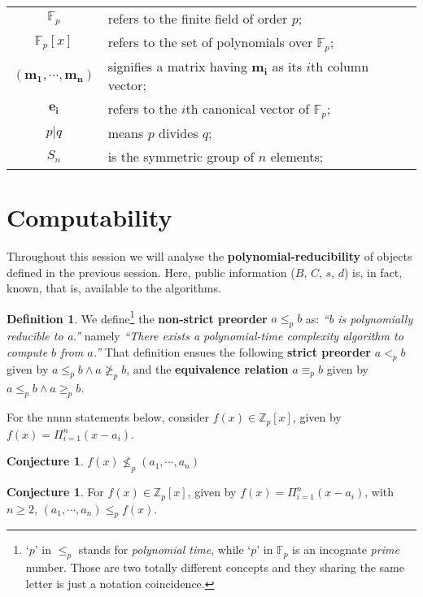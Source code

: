 \documentclass[a4paper,10pt]{article}
\theoremstyle{plain}
\theoremstyle{definition}
\newtheorem{defn}[thm]{Definition} %
\newtheorem{conj}[thm]{Conjecture} %
\theoremstyle{named}
\begin{document}
\begin{flushleft}
\begin{tabular}{c l}
    $\mathbb{F}_p$ & refers to the finite field of order $p$;\\
    $\mathbb{F}_p[x]$ & refers to the set of polynomials over $\mathbb{F}_p$;\\
    $\left(\mathbf{m_1},\cdots,\mathbf{m_n}\right)$ & signifies a matrix having $\mathbf{m_i}$ as its $i$th column vector;\\
    $\mathbf{e_i}$ & refers to the $i$th canonical vector of $\mathbb{F}_p$;\\
    $p|q$ & means $p$ divides $q$;\\
    $S_n$ & is the symmetric group of $n$ elements;\\
\end{tabular}
\end{flushleft}

\section{Computability}

Throughout this session we will analyse the \textbf{polynomial-reducibility} of objects defined in the previous session. Here, public information ($B$, $C$, $s$, $d$) is, in fact, known, that is, available to the algorithms.

\begin{defn}
We define\footnote{`$p$' in $\leq_p$ stands for \textit{polynomial time}, while `$p$' in $\mathbb{F}_p$ is an incognate \textit{prime} number. Those are two totally different concepts and they sharing the same letter is just a notation coincidence.} the \textbf{non-strict preorder} $a \leq_p b$ as: \textit{``b is polynomially reducible to a.''} namely \textit{``There exists a polynomial-time complexity algorithm to compute $b$ from $a$.''} That definition ensues the following \textbf{strict preorder} $a <_p b$ given by $a \leq_p b \land a \ngeq_p b$, and the \textbf{equivalence relation} $a \equiv_p b$ given by $a \leq_p b \land a \geq_p b$.
\end{defn}

For the nnnn statements below, consider $f(x) \in \mathbb{Z}_p[x]$, given by $f(x) = \Pi_{i = 1}^{n}(x-a_i)$.

\begin{conj}
\label{conj:polyfacthard}
$f(x) \nleq_p (a_1, \cdots, a_n)$
\end{conj}

\begin{conj}
\label{conj:polyfacthard}
For $f(x) \in \mathbb{Z}_p[x]$, given by $f(x) = \Pi_{i = 1}^{n}(x-a_i)$, with $n \geq 2$, $(a_1, \cdots, a_n) \leq_p f(x)$.
\end{conj}
\end{document}

